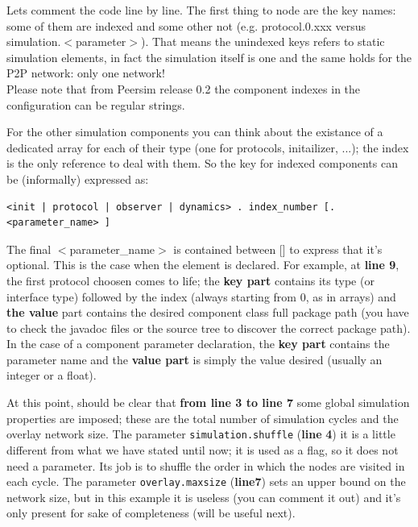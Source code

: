 \documentclass[a4paper,11pt]{article}
\begin{document}
Lets comment the code line by line. The first thing to node are the
key names: some of them are indexed and some other not (e.g. protocol.0.xxx
versus simulation.$<$parameter$>$). That means the unindexed keys refers
to static simulation elements, in fact the simulation itself is one
and the same holds for the P2P network: only one network!\\
Please note that from Peersim release 0.2 the component indexes in the
configuration can be regular strings.

For the other simulation components you can think about the existance
of a dedicated array for each of their type (one for protocols, initailizer,
...); the \textsf{index} is the only reference to deal with them.
So the key for indexed components can be (informally) expressed as:

\footnotesize
\begin{verbatim}
<init | protocol | observer | dynamics> . index_number [. <parameter_name> ]
\end{verbatim}
\normalsize

The final $<$parameter\_name$>$ is contained between {[}{]} to express
that it's optional. This is the case when the element is declared.
For example, at \textbf{line 9}, the first protocol choosen comes to life;
the \textbf{key part} contains its type (or interface type) followed
by the index (always starting from 0, as in arrays) and \textbf{the
value} part contains the desired component class full package path
(you have to check the javadoc files or the source tree to discover
the correct package path). In the case of a component parameter declaration,
the \textbf{key part} contains the parameter name and the \textbf{value
part} is simply the value desired (usually an integer or a float).

At this point, should be clear that \textbf{from line 3 to line 7}
some global simulation properties are imposed; these are the total
number of simulation cycles and the overlay network size. The parameter
\texttt{simulation.shuffle} (\textbf{line} \textbf{4}) it is a little
different from what we have stated until now; it is used as a flag,
so it does not need a parameter. Its job is to shuffle the order in
which the nodes are visited in each cycle. The parameter \texttt{overlay.maxsize}
(\textbf{line7}) sets an upper bound on the network size, but in this
example it is useless (you can comment it out) and it's only present
for sake of completeness (will be useful next). 
\end{document}
